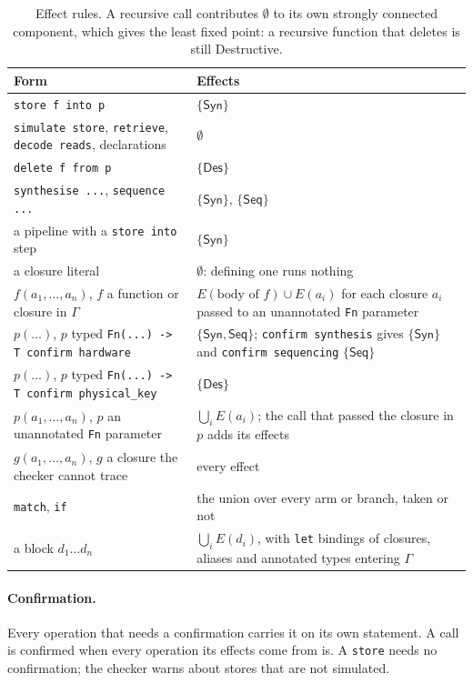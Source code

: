 \documentclass[11pt,a4paper]{article}
\newcommand{\Syn}{\mathsf{Syn}}
\newcommand{\Seq}{\mathsf{Seq}}
\newcommand{\Des}{\mathsf{Des}}
\newcommand{\nsl}[1]{\texttt{#1}}
\begin{document}
\begin{table}[t]
\centering
\small
\begin{tabularx}{\linewidth}{@{}lX@{}}
\toprule
Form & Effects \\
\midrule
\nsl{store f into p} & $\{\Syn\}$ \\
\nsl{simulate store}, \nsl{retrieve}, \nsl{decode reads}, declarations & $\emptyset$ \\
\nsl{delete f from p} & $\{\Des\}$ \\
\nsl{synthesise ...}, \nsl{sequence ...} & $\{\Syn\}$, $\{\Seq\}$ \\
a pipeline with a \nsl{store into} step & $\{\Syn\}$ \\
a closure literal & $\emptyset$: defining one runs nothing \\
$f(a_1,\dots,a_n)$, $f$ a function or closure in $\Gamma$ & $E(\text{body of } f) \cup E(a_i)$ for each closure $a_i$ passed to an unannotated \nsl{Fn} parameter \\
$p(\dots)$, $p$ typed \nsl{Fn(...) -> T confirm hardware} & $\{\Syn, \Seq\}$; \nsl{confirm synthesis} gives $\{\Syn\}$ and \nsl{confirm sequencing} $\{\Seq\}$ \\
$p(\dots)$, $p$ typed \nsl{Fn(...) -> T confirm physical\_key} & $\{\Des\}$ \\
$p(a_1,\dots,a_n)$, $p$ an unannotated \nsl{Fn} parameter & $\bigcup_i E(a_i)$; the call that passed the closure in $p$ adds its effects \\
$g(a_1,\dots,a_n)$, $g$ a closure the checker cannot trace & every effect \\
\nsl{match}, \nsl{if} & the union over every arm or branch, taken or not \\
a block $d_1 \dots d_n$ & $\bigcup_i E(d_i)$, with \nsl{let} bindings of closures, aliases and annotated types entering $\Gamma$ \\
\bottomrule
\end{tabularx}
\caption{Effect rules. A recursive call contributes $\emptyset$ to its own
strongly connected component, which gives the least fixed point: a
recursive function that deletes is still Destructive.}
\label{tab:rules}
\end{table}

\paragraph{Confirmation.} Every operation that needs a confirmation
carries it on its own statement. A call is confirmed when every operation
its effects come from is. A \nsl{store} needs no confirmation; the
checker warns about stores that are not simulated.
\end{document}

